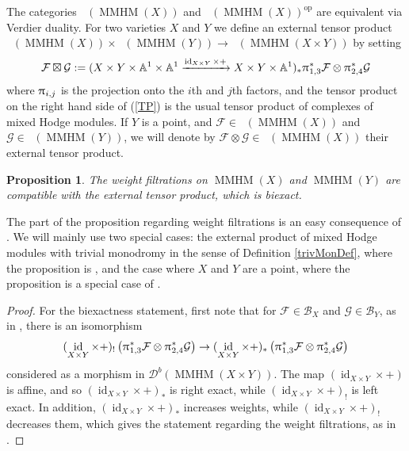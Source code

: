 \documentclass[a4paper,10pt]{amsart}
\newtheorem{proposition}[theorem]{Proposition}
\renewcommand{\pi}{\uppi\hspace{0.05em}}
\DeclareMathOperator{\MMHM}{MMHM}
\DeclareMathOperator{\id}{id}
\DeclareMathOperator{\Dulf}{\mathcal{D}^{\geq, lf}}
\DeclareMathOperator{\Dllf}{\mathcal{D}^{\leq, lf}}
\newcommand{\Db}{\mathcal{D}^{b}}
\begin{document}

The categories $\Dulf(\MMHM(X))$ and $\Dllf(\MMHM(X))^{\textrm{op}}$ are equivalent via Verdier duality.  For two varieties $X$ and $Y$ we define an external tensor product $\Dulf(\MMHM(X))\times\Dulf(\MMHM(Y))\rightarrow \Dulf(\MMHM(X\times Y))$ by setting
\begin{equation}
\label{TP}
\mathcal{F}\boxtimes\mathcal{G}:=(X\times Y\times \mathbb{A}^1\times\mathbb{A}^1\xrightarrow{\id_{X\times Y}\times +} X\times Y\times \mathbb{A}^1)_*\pi_{1,3}^*\mathcal{F}\otimes\pi_{2,4}^*\mathcal{G}
\end{equation}
where $\pi_{i,j}$ is the projection onto the $i$th and $j$th factors, and the tensor product on the right hand side of (\ref{TP}) is the usual tensor product of complexes of mixed Hodge modules.  If $Y$ is a point, and $\mathcal{F}\in\Dulf(\MMHM(X))$ and $\mathcal{G}\in\Dulf(\MMHM(Y))$, we will denote by $\mathcal{F}\otimes\mathcal{G}\in\Dulf(\MMHM(X))$ their external tensor product.
\begin{proposition}\label{tensPres}
The weight filtrations on $\MMHM(X)$ and $\MMHM(Y)$ are compatible with the external tensor product, which is biexact.
\end{proposition}
The part of the proposition regarding weight filtrations is an easy consequence of \cite[Prop.4]{COHA}.  We will mainly use two special cases: the external product of mixed Hodge modules with trivial monodromy in the sense of Definition \ref{trivMonDef}, where the proposition is \cite[(3.8.2)]{Sai90}, and the case where $X$ and $Y$ are a point, where the proposition is a special case of \cite[Prop.4]{COHA}.  
\begin{proof}
For the biexactness statement, first note that for $\mathcal{F}\in\mathcal{B}_X$ and $\mathcal{G}\in\mathcal{B}_Y$, as in \cite[Lem.1]{COHA}, there is an isomorphism
\[
(\id_{X\times Y}\times +)_!\left(\pi_{1,3}^*\mathcal{F}\otimes\pi_{2,4}^*\mathcal{G}\right)\rightarrow(\id_{X\times Y}\times +)_*\left(\pi_{1,3}^*\mathcal{F}\otimes\pi_{2,4}^*\mathcal{G}\right)
\]
considered as a morphism in $\Db(\MMHM(X\times Y))$.  The map $(\id_{X\times Y}\times +)$ is affine, and so $(\id_{X\times Y}\times +)_*$ is right exact, while $(\id_{X\times Y}\times +)_!$ is left exact.  In addition, $(\id_{X\times Y}\times +)_*$ increases weights, while $(\id_{X\times Y}\times +)_!$ decreases them, which gives the statement regarding the weight filtrations, as in \cite[Prop.4]{COHA}.
\end{proof}
\end{document}
